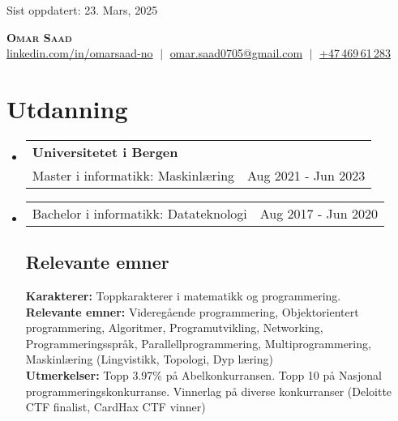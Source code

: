 \documentclass[letterpaper,11pt]{article}
\makeatletter
\newcommand{\resumeSubHeadingListStart}{\begin{itemize}[leftmargin=0.15in, label={}]}
\newcommand{\resumeSubHeadingListEnd}{\end{itemize}}
\newcommand{\resumeProjectHeading}[2]{
    \item
    \begin{tabular*}{0.97\textwidth}{l@{\extracolsep{\fill}}r}
      \small#1 & #2 \\
    \end{tabular*}\vspace{-7pt}
}
\makeatother
\begin{document}
\begin{flushright}
  \vspace{-4pt}
  \color{gray}
  \small{Sist oppdatert: 23. Mars, 2025}
\end{flushright}

\vspace{-35pt}

\begin{center}
    \textbf{\Huge \scshape Omar Saad} \\ \vspace{8pt}
    \small 
        \href{https://www.linkedin.com/in/omarsaad-no}{linkedin.com/in/omarsaad-no} $\;|\;$
        \href{mailto:omar.saad0705@gmail.com}{omar.saad0705@gmail.com} $\;|\;$
        \href{tel:+4746961283}{+47\,469\,61\,283}
\end{center}

\section{Utdanning}
  \resumeSubHeadingListStart
  
    \resumeProjectHeading
      {\textbf{Universitetet i Bergen} \\
      \small{Master i informatikk: Maskinlæring}}{Aug 2021 - Jun 2023}

    \resumeProjectHeading
      {\small{Bachelor i informatikk: Datateknologi}}{Aug 2017 - Jun 2020}

    \vspace{-5pt}
    \subsection{Relevante emner}
      \textbf{Karakterer:} Toppkarakterer i matematikk og programmering.\\
      \textbf{Relevante emner:} Videregående programmering, Objektorientert programmering, Algoritmer, Programutvikling, Networking, Programmeringsspråk, Parallellprogrammering, Multiprogrammering, Maskinlæring (Lingvistikk, Topologi, Dyp læring) \\
      \textbf{Utmerkelser:} Topp 3.97\% på Abelkonkurransen. Topp 10 på Nasjonal programmeringskonkurranse. Vinnerlag på diverse konkurranser (Deloitte CTF finalist, CardHax CTF vinner)

  \resumeSubHeadingListEnd
\end{document}
